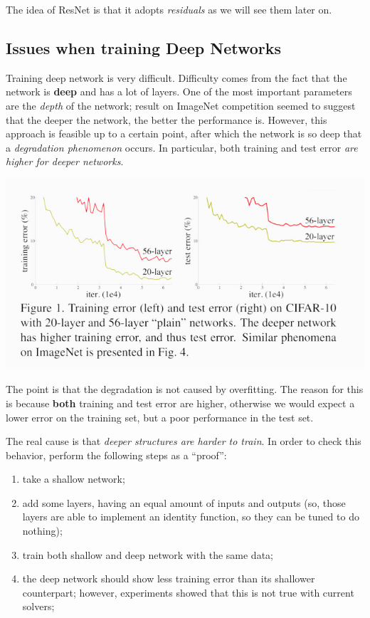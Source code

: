 \documentclass[10pt]{report}
\begin{document}
The idea of ResNet is that it adopts \emph{residuals} as we will see them later on.

\subsection{Issues when training Deep Networks}
\label{sec:org70c5e9b}
Training deep network is very difficult. Difficulty comes from the fact
that the network is \textbf{deep} and has a lot of layers. One of the most
important parameters are the \emph{depth} of the network; result on ImageNet
competition seemed to suggest that the deeper the network, the better
the performance is. However, this approach is feasible up to a certain
point, after which the network is so deep that a \emph{degradation
phenomenon} occurs. In particular, both training and test error \emph{are
higher for deeper networks}.

\begin{center}
\includegraphics[width=.9\linewidth]{./pics/cnn/deep-vs-deeper.jpg}
\end{center}

The point is that the degradation is not caused by overfitting. The
reason for this is because \textbf{both} training and test error are higher,
otherwise we would expect a lower error on the training set, but a poor
performance in the test set.

The real cause is that \emph{deeper structures are harder to train}. In order
to check this behavior, perform the following steps as a ``proof'':

\begin{enumerate}
\item take a shallow network;
\item add some layers, having an equal amount of inputs and outputs (so,
those layers are able to implement an identity function, so they can
be tuned to do nothing);
\item train both shallow and deep network with the same data;
\item the deep network should show less training error than its shallower
counterpart; however, experiments showed that this is not true with
current solvers;
\end{enumerate}
\end{document}
